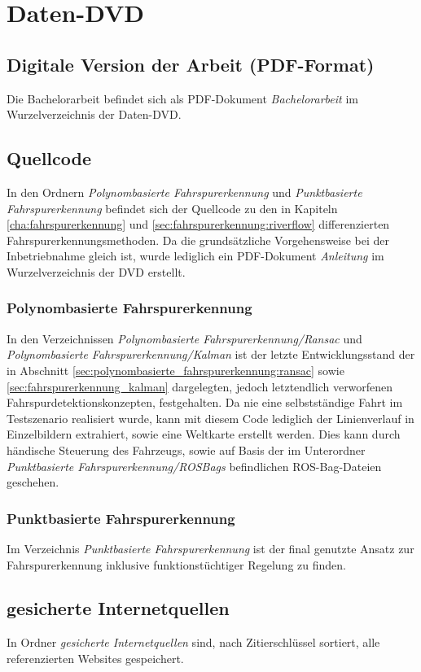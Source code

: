 \appendix
{} %
\newcommand{\fdname}[1]{\emph{#1}}
\chapter{Daten-DVD}	
\section{Digitale Version der Arbeit (PDF-Format)}
Die Bachelorarbeit befindet sich als PDF-Dokument \fdname{Bachelorarbeit} im Wurzelverzeichnis der Daten-DVD.

\section{Quellcode}
In den Ordnern \fdname{Polynombasierte Fahrspurerkennung} und \fdname{Punktbasierte Fahrspurerkennung} befindet sich der Quellcode zu den in Kapiteln \ref{cha:fahrspurerkennung} und \ref{sec:fahrspurerkennung:riverflow} differenzierten Fahrspurerkennungsmethoden. Da die grundsätzliche Vorgehensweise bei der Inbetriebnahme gleich ist, wurde lediglich ein PDF-Dokument \fdname{Anleitung} im Wurzelverzeichnis der DVD erstellt.

\subsection{Polynombasierte Fahrspurerkennung}
In den Verzeichnissen \fdname{Polynombasierte Fahrspurerkennung/Ransac} und \fdname{Polynombasierte Fahrspurerkennung/Kalman} ist der letzte Entwicklungsstand der in Abschnitt \ref{sec:polynombasierte_fahrspurerkennung:ransac} sowie \ref{sec:fahrspurerkennung_kalman} dargelegten, jedoch letztendlich verworfenen Fahrspurdetektionskonzepten, festgehalten. Da nie eine selbstständige Fahrt im Testszenario realisiert wurde, kann mit diesem Code lediglich der Linienverlauf in Einzelbildern extrahiert, sowie eine Weltkarte erstellt werden. Dies kann durch händische Steuerung des Fahrzeugs, sowie auf Basis der im Unterordner \fdname{Punktbasierte Fahrspurerkennung/ROSBags} befindlichen
ROS-Bag-Dateien geschehen.

\subsection{Punktbasierte Fahrspurerkennung}
\label{anhang:quellcode:punktbasierte}
Im Verzeichnis \fdname{Punktbasierte Fahrspurerkennung} ist der final genutzte Ansatz zur Fahrspurerkennung inklusive funktionstüchtiger Regelung zu finden.

\section{gesicherte Internetquellen}
In Ordner \fdname{gesicherte Internetquellen} sind, nach Zitierschlüssel sortiert, alle referenzierten Websites gespeichert.
